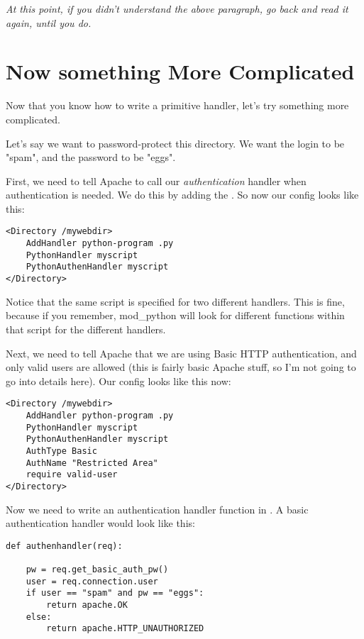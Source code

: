  \emph{At this point, if you didn't understand the above paragraph, go back and read it again, until you do.}

\section{Now something More Complicated\label{tut-more-complicated}}

Now that you know how to write a primitive handler, let's try
something more complicated.

Let's say we want to password-protect this directory. We want the
login to be "spam", and the password to be "eggs".

First, we need to tell Apache to call our \emph{authentication} handler when
authentication is needed. We do this by adding the
. So now our config looks like this:

\begin{verbatim}
<Directory /mywebdir>
    AddHandler python-program .py
    PythonHandler myscript
    PythonAuthenHandler myscript
</Directory>
\end{verbatim}

Notice that the same script is specified for two different
handlers. This is fine, because if you remember, mod_python will look
for different functions within that script for the different handlers.

Next, we need to tell Apache that we are using Basic HTTP
authentication, and only valid users are allowed (this is fairly basic
Apache stuff, so I'm not going to go into details here). Our config
looks like this now:

\begin{verbatim}
<Directory /mywebdir>
    AddHandler python-program .py
    PythonHandler myscript
    PythonAuthenHandler myscript
    AuthType Basic
    AuthName "Restricted Area"
    require valid-user
</Directory>
\end{verbatim}          

Now we need to write an authentication handler function in
. A basic authentication handler would look like this:

\begin{verbatim}
def authenhandler(req):

    pw = req.get_basic_auth_pw()
    user = req.connection.user     
    if user == "spam" and pw == "eggs":
        return apache.OK
    else:
        return apache.HTTP_UNAUTHORIZED
\end{verbatim}  

